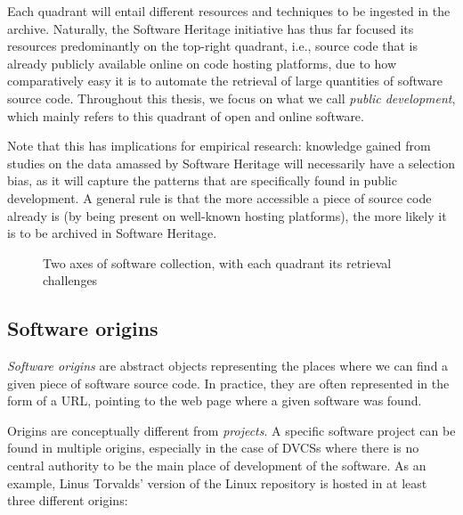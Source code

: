 Each quadrant will entail different resources and techniques to be ingested in
the archive. Naturally, the Software Heritage initiative has thus far focused
its resources predominantly on the top-right quadrant, i.e., source code that is
already publicly available online on code hosting platforms, due to how
comparatively easy it is to automate the retrieval of large quantities of
software source code.  Throughout this thesis, we focus on what we call
\emph{public development}, which mainly refers to this quadrant of open and
online software.

Note that this has implications for empirical research: knowledge gained from
studies on the data amassed by Software Heritage will necessarily have a
selection bias, as it will capture the patterns that are specifically
found in public development. A general rule is that the more accessible a
piece of source code already is (by being present on well-known hosting
platforms), the more likely it is to be archived in Software Heritage.

\begin{figure}
    \centering
    \caption{Two axes of software collection, with each quadrant its
    retrieval challenges}%
    \label{fig:swh-collect-axes}
\end{figure}

\subsection{Software origins}

\emph{Software origins} are abstract objects representing the places where we
can find a given piece of software source code. In practice, they are often
represented in the form of a URL, pointing to the web page where a given
software was found.

Origins are conceptually different from \emph{projects}. A specific software
project can be found in multiple origins, especially in the case of \glspl{DVCS}
where there is no central authority to be the main place of development of the
software. As an example, Linus Torvalds' version of the Linux repository is
hosted in at least three different origins:

